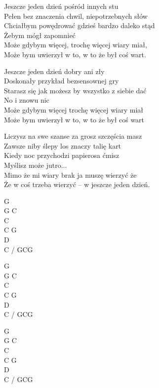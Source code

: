 \begin{text}
    Jeszcze jeden dzień pośród innych stu\\
    Pełen bez znaczenia chwil, niepotrzebnych słów\\
    Chciałbym powędrować gdzieś bardzo daleko stąd\\
    Żebym mógł zapomnieć\\
    Może gdybym więcej, trochę więcej wiary miał,\\
    Może bym uwierzył w to, w to że był coś wart.

    Jeszcze jeden dzień dobry ani zły\\
    Doskonały przykład bezsensownej gry\\
    Starasz się jak możesz by wszystko z siebie dać\\
    No i znowu nic\\
    Może gdybym więcej trochę więcej wiary miał\\
    Może bym uwierzył w to, w to że był coś wart

    Liczysz na swe szanse za grosz szczęścia masz\\
    Zawsze niby ślepy los znaczy talię kart\\
    Kiedy noc przychodzi papierosa ćmisz\\
    Myślisz może jutro...\\
    Mimo że mi wiary brak ja muszę wierzyć że\\
    Że w coś trzeba wierzyć – w jeszcze jeden dzień.
\end{text}
\begin{chord}
    G\\
    G C\\
    C\\
    C G\\
    D\\
    C / GCG

    G\\
    G C\\
    C\\
    C G\\
    D\\
    C / GCG

    G\\
    G C\\
    C\\
    C G\\
    D\\
    C / GCG
\end{chord}